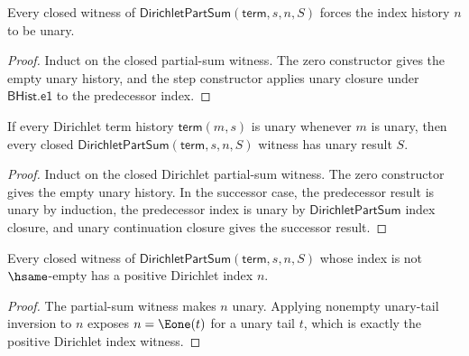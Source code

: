 \begin{lemma}
\label{lem:dirichlet-part-sum-index-unary}
Every closed witness of $\mathsf{DirichletPartSum}(\mathsf{term},s,n,S)$
forces the index history $n$ to be unary.
\end{lemma}
\begin{proof}
Induct on the closed partial-sum witness. The zero constructor gives the empty
unary history, and the step constructor applies unary closure under
$\mathsf{BHist.e1}$ to the predecessor index.
\end{proof}

\begin{theorem}
\label{thm:dirichlet-part-sum-result-unary}
If every Dirichlet term history $\mathsf{term}(m,s)$ is unary whenever $m$
is unary, then every closed
$\mathsf{DirichletPartSum}(\mathsf{term},s,n,S)$ witness has unary result
$S$.
\end{theorem}
\begin{proof}
Induct on the closed Dirichlet partial-sum witness. The zero constructor gives
the empty unary history. In the successor case, the predecessor result is unary
by induction, the predecessor index is unary by
$\mathsf{DirichletPartSum}$ index closure, and unary continuation closure
gives the successor result.
\end{proof}

\begin{theorem}
\label{thm:dirichlet-part-sum-nonempty-index-positive}
Every closed witness of \(\mathsf{DirichletPartSum}(\mathsf{term},s,n,S)\)
whose index is not \(\hsame\)-empty has a positive Dirichlet index \(n\).
\end{theorem}
\begin{proof}
The partial-sum witness makes \(n\) unary. Applying nonempty unary-tail
inversion to \(n\) exposes \(n=\Eone(t)\) for a unary tail \(t\), which is
exactly the positive Dirichlet index witness.
\end{proof}


